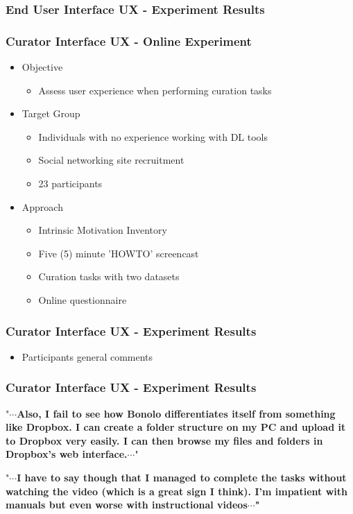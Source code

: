 \documentclass[xcolor=dvitex,t,11pt]{beamer}
\begin{document}
\begin{frame}[fragile]
\frametitle{End User Interface UX - Experiment Results}
\centering

\end{frame}

\begin{frame}[fragile]
\frametitle{Curator Interface UX - Online Experiment}
\begin{itemize}
\item Objective
\begin{itemize}
\item Assess user experience when performing curation tasks
\end{itemize}
\item Target Group
\begin{itemize}
\item Individuals with no experience working with DL tools
\item Social networking site recruitment
\item 23 participants
\end{itemize}
\item Approach
\begin{itemize}
\item Intrinsic Motivation Inventory
\item Five (5) minute 'HOWTO' screencast
\item Curation tasks with two datasets
\item Online questionnaire
\end{itemize}
\end{itemize}
\end{frame}


\begin{frame}[fragile]
\frametitle{Curator Interface UX - Experiment Results}
\centering

\end{frame}


\begin{frame}[fragile]

\begin{itemize}
\item Participants general comments
\end{itemize}

\frametitle{Curator Interface UX - Experiment Results}
"\textbf{$\cdots$Also, I fail to see how Bonolo differentiates itself from something like Dropbox. I can create a folder structure on my PC and upload it to Dropbox very easily. I can then browse my files and folders in Dropbox's web interface.$\cdots$}"\\

\bigskip

"\textbf{$\cdots$I have to say though that I managed to complete the tasks without watching the video (which is a great sign I think). I'm impatient with manuals but even worse with instructional videos$\cdots$"}
\end{frame}
\end{document}
